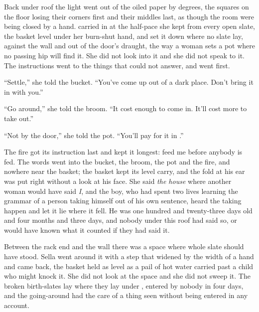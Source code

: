Back under  roof the light went out of the oiled paper by degrees, the squares on the floor losing their corners first and their middles last, as though the room were being closed by a hand.  carried  in at the half-pace she kept from every open slate, the basket level under her burn-shut hand, and set it down where no slate lay, against the wall and out of the door's draught, the way a woman sets a pot where no passing hip will find it. She did not look into it and she did not speak to it. The instructions went to the things that could not answer, and went first.

“Settle,” she told the bucket. “You've come up out of a dark place. Don't bring it in with you.”

“Go around,” she told the broom. “It cost enough to come in. It'll cost more to take out.”

“Not by the door,” she told the pot. “You'll pay for it in .”

The fire got its instruction last and kept it longest: feed me before anybody is fed. The words went into the bucket, the broom, the pot and the fire, and nowhere near the basket; the basket kept its level carry, and the fold at his ear was put right without a look at his face. She said \emph{the house} where another woman would have said \emph{I}, and the boy, who had spent two lives learning the grammar of a person taking himself out of his own sentence, heard the taking happen and let it lie where it fell. He was one hundred and twenty-three days old and four months and three days, and nobody under this roof had said so, or would have known what it counted if they had said it.

Between the rack end and the wall there was a space where whole slate should have stood. Sella went around it with a step that widened by the width of a hand and came back, the basket held as level as a pail of hot water carried past a child who might knock it. She did not look at the space and she did not sweep it. The broken birth-slates lay where they lay under , entered by nobody in four days, and the going-around had the care of a thing seen without being entered in any account.

